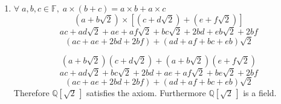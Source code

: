 \documentclass[letterpaper,12pt]{article}
\begin{document}
\begin{spacing}{1.5}
\begin{enumerate}
\begin{enumerate}[(F 1)]
\item $\forall\; a, b, c \in \mathbb{F},\; a\times(b+c) = a\times b + a
  \times c$
\begin{equation}
\left(a+b\sqrt{2}\right)\times\left[\left(c+d\sqrt{2}\right)+\left(e+f\sqrt{2}\right)\right]
\end{equation}
\begin{equation}
ac +ad\sqrt{2} +ae +af\sqrt{2} + bc\sqrt{2} +2bd +eb\sqrt{2} +2bf
\end{equation}
\begin{equation}
\left(ac +ae +2bd + 2bf\right) + \left(ad +af + bc +eb \right)\sqrt{2}
\end{equation}

\begin{equation}
\left(a+b\sqrt{2}\right)\left(c+d\sqrt{2}\right)+\left(a+b\sqrt{2}\right)\left(e+f\sqrt{2}\right)
\end{equation}
\begin{equation}
ac + ad\sqrt{2} + bc\sqrt{2} + 2bd + ae +af\sqrt{2} + be\sqrt{2} + 2bf
\end{equation}
\begin{equation}
\left(ac + ae +2bd +2bf\right) + \left(ad + af + bc + eb\right)\sqrt{2}
\end{equation}
Therefore $\mathbb{Q}\left[\sqrt{2}\,\right]$ satisfies the
axiom. Furthermore $\mathbb{Q}\left[\sqrt{2}\,\right]$ is a field.

\end{enumerate}
\end{enumerate}
\end{spacing}
\end{document}

